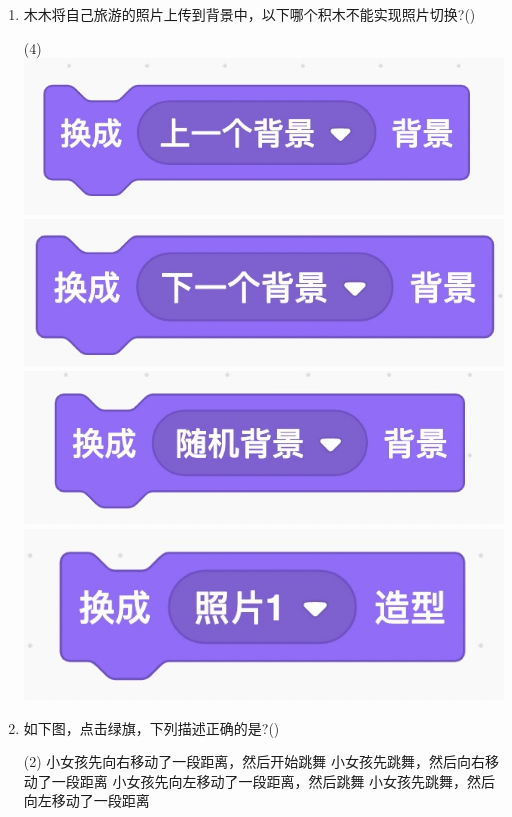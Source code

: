 \documentclass[10pt, a4paper]{article}
\begin{document}
\begin{enumerate}
        \item 木木将自己旅游的照片上传到背景中，以下哪个积木不能实现照片切换?(\qquad)
        \begin{tasks}(4)
            \task \includegraphics[width=.15\textwidth]{7a.jpg}
            \task \includegraphics[width=.15\textwidth]{7b.jpg}
            \task \includegraphics[width=.15\textwidth]{7c.jpg}
            \task \includegraphics[width=.15\textwidth]{7d.jpg}
        \end{tasks}
           
        \newpage
        \item 如下图，点击绿旗，下列描述正确的是?(\qquad)
        \begin{tasks}(2)
            \task 小女孩先向右移动了一段距离，然后开始跳舞
            \task 小女孩先跳舞，然后向右移动了一段距离
            \task 小女孩先向左移动了一段距离，然后跳舞
            \task 小女孩先跳舞，然后向左移动了一段距离
        \end{tasks}


\end{enumerate}
\end{document}
